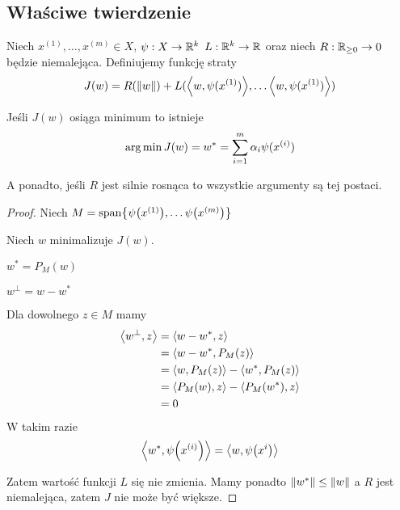 \subsection{Właściwe twierdzenie}
\begin{theorem}[O reprezentacji]
Niech \( x^{(1)}, \dots, x^{(m)} \in X \), \( \psi : X \rightarrow \mathbb{R}^k \)
\( L : \mathbb{R}^k \rightarrow \mathbb{R} \) oraz niech \( R : \mathbb{R}_{\geq 0} \rightarrow 0 \) będzie niemalejąca.
Definiujemy funkcję straty
\[
    J(w) = R(\norm{w}) + L(\dotproduct{w, \psi(x^{(1)})}, \dots \dotproduct{w, \psi(x^{(1)})})
\]

Jeśli \( J(w) \) osiąga minimum to istnieje 
\[
    \operatorname*{arg\,min} J(w) = w^* = \sum_{i=1}^m \alpha_i \psi(x^{(i)})
\]

A ponadto, jeśli \( R \) jest silnie rosnąca to wszystkie argumenty są tej postaci.

\end{theorem}
\begin{proof}
    Niech \( M = \text{span} \set{\psi\pars{x^{(1)}}, \dots \psi\pars{x^{(m)}}} \)
    
    Niech \( w \) minimalizuje \( J(w) \).
    
    \( w^* = P_M(w) \)
    
    \( w^\perp = w - w^* \)
    
    Dla dowolnego \( z \in M \) mamy
    \begin{align*}
        \left\langle w^\perp, z\right\rangle
        &= \left\langle w - w^*, z\right\rangle \\
        &= \left\langle w - w^*, P_M(z)\right\rangle \\
        &= \left\langle w, P_M(z)\right\rangle - \left\langle w^*, P_M(z)\right\rangle \\
        &= \left\langle P_M(w), z\right\rangle - \left\langle P_M(w^*), z\right\rangle \\
        &= 0
    \end{align*}
    W takim razie 
    \[
        \dotproduct{w^*, \psi\pars{x^{(i)}}}
        = 
        \dotproduct{w, \psi\pars{x^{i}}}
    \]
    
    Zatem wartość funkcji \( L \) się nie zmienia.
    Mamy ponadto \( \left\Vert w^* \right\Vert \leq \left\Vert w \right\Vert \) a \( R \) jest niemalejąca, zatem \( J \) nie może być większe.
\end{proof}